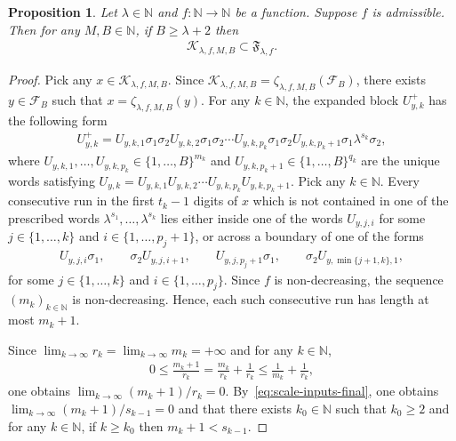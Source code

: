\documentclass[12pt,reqno]{amsart}
\theoremstyle{definition}
\theoremstyle{plain}
\newtheorem{prop}{Proposition}
\begin{document}
\begin{prop}
\label{prop:run-control-final}
Let $\lambda\in\mathbb{N}$ and $f:\mathbb{N}\to\mathbb{N}$ be a function. Suppose $f$ is admissible. Then for any $M,B\in\mathbb{N}$, if $B\geq \lambda+2$ then
\begin{align*}
    \mathcal{K}_{\lambda,f,M,B}\subset \mathfrak{F}_{\lambda,f}.
\end{align*}
\end{prop}
\begin{proof}
Pick any $x\in \mathcal{K}_{\lambda,f,M,B}$. Since $\mathcal{K}_{\lambda,f,M,B}=\zeta_{\lambda,f,M,B}(\mathcal{F}_B)$, there exists $y\in \mathcal{F}_B$ such that $x=\zeta_{\lambda,f,M,B}(y)$. For any $k\in\mathbb{N}$, the expanded block $U^+_{y,k}$ has the following form
\begin{align*}
    U^+_{y,k}
    =U_{y,k,1}\sigma_1\sigma_2U_{y,k,2}\sigma_1\sigma_2\cdots U_{y,k,p_k}\sigma_1\sigma_2U_{y,k,p_k+1}\sigma_1\lambda^{s_k}\sigma_2,
\end{align*}
where $U_{y,k,1},\dots,U_{y,k,p_k}\in \{1,\dots,B\}^{m_k}$ and $U_{y,k,p_k+1}\in \{1,\dots,B\}^{q_k}$ are the unique words satisfying $U_{y,k}=U_{y,k,1}U_{y,k,2}\cdots U_{y,k,p_k}U_{y,k,p_k+1}$. Pick any $k\in\mathbb{N}$. Every consecutive run in the first $t_k-1$ digits of $x$ which is not contained in one of the prescribed words $\lambda^{s_1},\ldots,\lambda^{s_k}$ lies either inside one of the words $U_{y,j,i}$ for some $j\in\{1,\ldots,k\}$ and $i\in\{1,\ldots,p_j+1\}$, or across a boundary of one of the forms
\begin{align*}
    U_{y,j,i}\sigma_1,\qquad
    \sigma_2U_{y,j,i+1},\qquad
    U_{y,j,p_j+1}\sigma_1,\qquad
    \sigma_2U_{y,\min\{j+1,k\},1},
\end{align*}
for some $j\in\{1,\ldots,k\}$ and $i\in\{1,\ldots,p_j\}$. Since $f$ is non-decreasing, the sequence $(m_k)_{k\in\mathbb{N}}$ is non-decreasing. Hence, each such consecutive run has length at most $m_k+1$. 

Since $\lim_{k\to\infty}r_k=\lim_{k\to\infty}m_k=+\infty$ and for any $k\in\mathbb{N}$, 
\begin{align*}
    0
    \leq \frac{m_k+1}{r_k}=\frac{m_k}{r_k}+\frac{1}{r_k}
    \leq \frac{1}{m_k}+\frac{1}{r_k},
\end{align*}
one obtains $\lim_{k\to\infty}{(m_k+1)}/{r_k}=0$. By~\eqref{eq:scale-inputs-final}, one obtains $\lim_{k\to\infty}{(m_k+1)}/{s_{k-1}}=0$ and that there exists $k_0\in\mathbb{N}$ such that $k_0\geq2$ and for any $k\in\mathbb{N}$, if $k\geq k_0$ then $m_k+1<s_{k-1}$. 


\end{proof}
\end{document}
